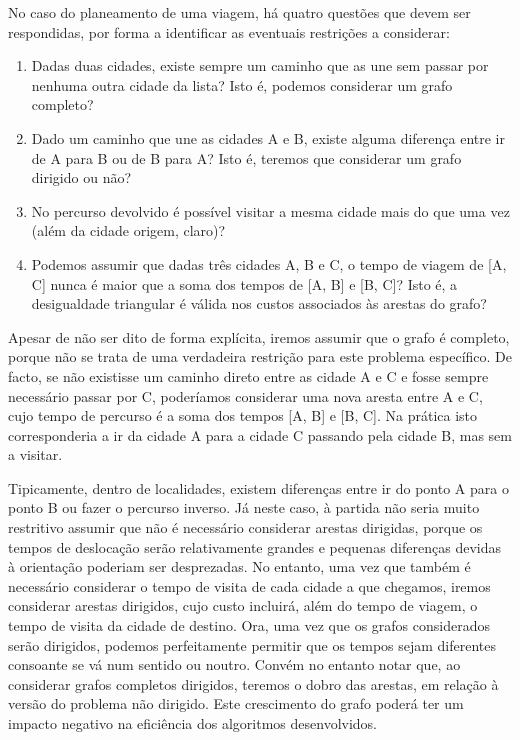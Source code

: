 \documentclass[12pt,a4paper,reqno]{report}
\numberwithin{figure}{section}
\numberwithin{equation}{section}
\begin{document}
No caso do planeamento de uma viagem, há quatro questões que devem ser respondidas, por forma a identificar as eventuais restrições a considerar:
\begin{enumerate}
	\item Dadas duas cidades, existe sempre um caminho que as une sem passar por nenhuma outra cidade da lista? Isto é, podemos considerar um grafo completo?
	\item Dado um caminho que une as cidades A e B, existe alguma diferença entre ir de A para B ou de B para A? Isto é, teremos que considerar um grafo dirigido ou não?
	\item No percurso devolvido é possível visitar a mesma cidade mais do que uma vez (além da cidade origem, claro)?
	\item Podemos assumir que dadas três cidades A, B e C, o tempo de viagem de [A, C] nunca é maior que a soma dos tempos de [A, B] e [B, C]? Isto é, a desigualdade triangular é válida nos custos associados às arestas do grafo?
\end{enumerate}

Apesar de não ser dito de forma explícita, iremos assumir que o grafo é completo, porque não se trata de uma verdadeira restrição para este problema específico. De facto, se não existisse um caminho direto entre as cidade A e C e fosse sempre necessário passar por C, poderíamos considerar uma nova aresta entre A e C, cujo tempo de percurso é a soma dos tempos [A, B] e [B, C]. Na prática isto corresponderia a ir da cidade A para a cidade C passando pela cidade B, mas sem a visitar.

Tipicamente, dentro de localidades, existem diferenças entre ir do ponto A para o ponto B ou fazer o percurso inverso. Já neste caso, à partida não seria muito restritivo assumir que não é necessário considerar arestas dirigidas, porque os tempos de deslocação serão relativamente grandes e pequenas diferenças devidas à orientação poderiam ser desprezadas. No entanto, uma vez que também é necessário considerar o tempo de visita de cada cidade a que chegamos, iremos considerar arestas dirigidos, cujo custo incluirá, além do tempo de viagem, o tempo de visita da cidade de destino. Ora, uma vez que os grafos considerados serão dirigidos, podemos perfeitamente permitir que os tempos sejam diferentes consoante se vá num sentido ou noutro. Convém no entanto notar que, ao considerar grafos completos dirigidos, teremos o dobro das arestas, em relação à versão do problema não dirigido. Este crescimento do grafo poderá ter um impacto negativo na eficiência dos algoritmos desenvolvidos.
\end{document}
